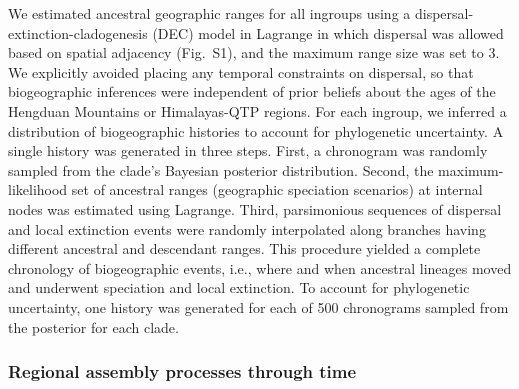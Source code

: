 We estimated ancestral geographic ranges for all ingroups using a
dispersal-extinction-cladogenesis (DEC) model in Lagrange
\citep{Ree2005,Ree2008} in which dispersal was allowed based on
spatial adjacency (Fig.~S1), and the maximum range size was set to
3. We explicitly avoided placing any temporal constraints on
dispersal, so that biogeographic inferences were independent of prior
beliefs about the ages of the Hengduan Mountains or Himalayas-QTP
regions. For each ingroup, we inferred a distribution of biogeographic
histories to account for phylogenetic uncertainty. A single history
was generated in three steps. First, a chronogram was randomly sampled
from the clade's Bayesian posterior distribution. Second, the
maximum-likelihood set of ancestral ranges (geographic speciation
scenarios) at internal nodes was estimated using Lagrange. Third,
parsimonious sequences of dispersal and local extinction events were
randomly interpolated along branches having different ancestral and
descendant ranges. This procedure yielded a complete chronology of
biogeographic events, i.e., where and when ancestral lineages moved
and underwent speciation and local extinction. To account for
phylogenetic uncertainty, one history was generated for each of 500
chronograms sampled from the posterior for each clade.

\subsubsection*{Regional assembly processes through time}

